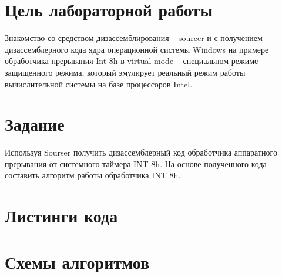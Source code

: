 \section{Цель лабораторной работы}

Знакомство со средством дизассемблирования – sourcer и с получением дизассемблерного кода ядра операционной системы Windows на примере обработчика прерывания Int 8h в virtual mode – специальном режиме защищенного режима, который эмулирует реальный режим работы вычислительной системы на базе процессоров Intel.

\section{Задание}

Используя Sourser получить дизассемблерный код обработчика аппаратного прерывания от системного таймера INT 8h. На основе полученного кода составить алгоритм работы обработчика INT 8h.

\section{Листинги кода}





\section{Схемы алгоритмов}


